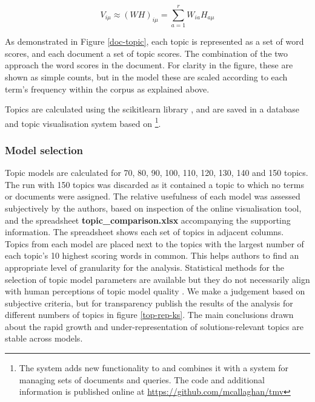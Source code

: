 \documentclass{article}
\begin{document}
\begin{linenumbers}
		\begin{equation}
		V_{i\mu} \approx (WH)_{i\mu} = \sum_{a=1}^{r}W_{ia}H_{a\mu}
		\end{equation}
		
		As demonstrated in Figure \ref{doc-topic}, each topic is represented as a set of word scores, and each document a set of topic scores. The combination of the two approach the word scores in the document. For clarity in the figure, these are shown as simple counts, but in the model these are scaled according to each term's frequency within the corpus as explained above.
		
		Topics are calculated using the scikitlearn library \cite{Pedregosa2011}, and are saved in a database and topic visualisation system based on \cite{Chaney2012} \footnote{The system adds new functionality to \cite{Chaney2012} and combines it with a system for managing sets of documents and queries. The code and additional information is published online at \url{https://github.com/mcallaghan/tmv}}. 	
		
		\subsubsection*{Model selection}
		
		Topic models are calculated for 70, 80, 90, 100, 110, 120, 130, 140 and 150 topics. The run with 150 topics was discarded as it contained a topic to which no terms or documents were assigned. The relative usefulness of each model was assessed subjectively by the authors, based on inspection of the online visualisation tool, and the spreadsheet \textbf{topic\_comparison.xlsx} accompanying the supporting information. The spreadsheet shows each set of topics in adjacent columns. Topics from each model are placed next to the topics with the largest number of each topic's 10 highest scoring words in common. This helps authors to find an appropriate level of granularity for the analysis. Statistical methods for the selection of topic model parameters are available but they do not necessarily align with human perceptions of topic model quality \cite{Chang2009}. We make a judgement based on subjective criteria, but for transparency publish the results of the analysis for different numbers of topics in figure \ref{top-rep-ks}. The main conclusions drawn about the rapid growth and under-representation of solutions-relevant topics are stable across models.
		
		

\end{linenumbers}
\end{document}
